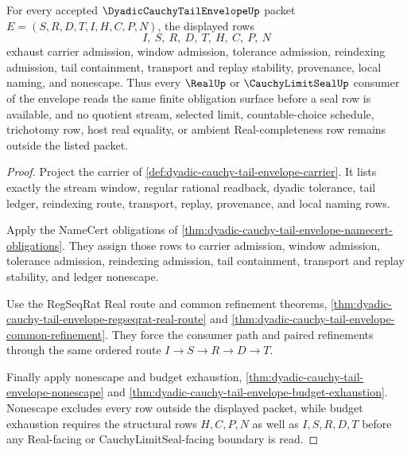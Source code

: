 \begin{theorem}
\label{thm:dyadic-cauchy-tail-envelope-obligation-completeness}
For every accepted $\DyadicCauchyTailEnvelopeUp$ packet $E=(S,R,D,T,I,H,C,P,N)$, the displayed rows
$$
I,\ S,\ R,\ D,\ T,\ H,\ C,\ P,\ N
$$
exhaust carrier admission, window admission, tolerance admission, reindexing admission, tail containment, transport and replay stability, provenance, local naming, and nonescape. Thus every $\RealUp$ or $\CauchyLimitSealUp$ consumer of the envelope reads the same finite obligation surface before a seal row is available, and no quotient stream, selected limit, countable-choice schedule, trichotomy row, host real equality, or ambient Real-completeness row remains outside the listed packet.
\end{theorem}
\begin{proof}
Project the carrier of \autoref{def:dyadic-cauchy-tail-envelope-carrier}. It lists exactly the stream window, regular rational readback, dyadic tolerance, tail ledger, reindexing route, transport, replay, provenance, and local naming rows.

Apply the NameCert obligations of \autoref{thm:dyadic-cauchy-tail-envelope-namecert-obligations}. They assign those rows to carrier admission, window admission, tolerance admission, reindexing admission, tail containment, transport and replay stability, and ledger nonescape.

Use the RegSeqRat Real route and common refinement theorems, \autoref{thm:dyadic-cauchy-tail-envelope-regseqrat-real-route} and \autoref{thm:dyadic-cauchy-tail-envelope-common-refinement}. They force the consumer path and paired refinements through the same ordered route $I \longrightarrow S \longrightarrow R \longrightarrow D \longrightarrow T$.

Finally apply nonescape and budget exhaustion, \autoref{thm:dyadic-cauchy-tail-envelope-nonescape} and \autoref{thm:dyadic-cauchy-tail-envelope-budget-exhaustion}. Nonescape excludes every row outside the displayed packet, while budget exhaustion requires the structural rows $H,C,P,N$ as well as $I,S,R,D,T$ before any Real-facing or CauchyLimitSeal-facing boundary is read.
\end{proof}

